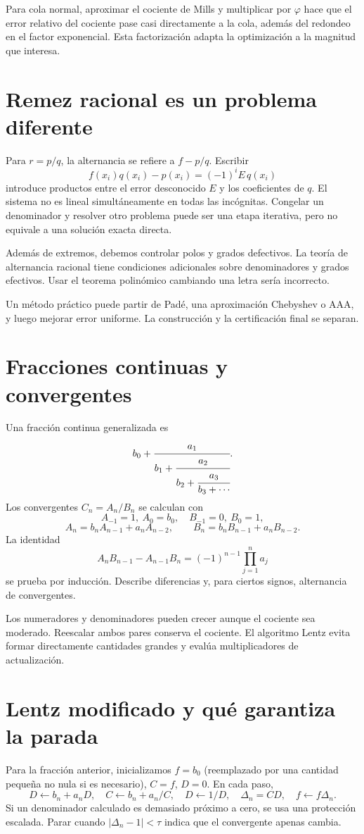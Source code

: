 \documentclass[11pt,a4paper]{article}
\theoremstyle{definition}
\newcommand{\ph}{\varphi}
\newcounter{problema}
\begin{document}
Para cola normal, aproximar el cociente de Mills y multiplicar por $\ph$ hace que el error relativo del cociente pase casi directamente a la cola, además del redondeo en el factor exponencial. Esta factorización adapta la optimización a la magnitud que interesa.

\section{Remez racional es un problema diferente}
Para $r=p/q$, la alternancia se refiere a $f-p/q$. Escribir
\[
f(x_i)q(x_i)-p(x_i)=(-1)^iE\,q(x_i)
\]
introduce productos entre el error desconocido $E$ y los coeficientes de $q$. El sistema no es lineal simultáneamente en todas las incógnitas. Congelar un denominador y resolver otro problema puede ser una etapa iterativa, pero no equivale a una solución exacta directa.

Además de extremos, debemos controlar polos y grados defectivos. La teoría de alternancia racional tiene condiciones adicionales sobre denominadores y grados efectivos. Usar el teorema polinómico cambiando una letra sería incorrecto.

Un método práctico puede partir de Padé, una aproximación Chebyshev o AAA, y luego mejorar error uniforme. La construcción y la certificación final se separan.

\section{Fracciones continuas y convergentes}
Una fracción continua generalizada es
\[
b_0+\cfrac{a_1}{b_1+\cfrac{a_2}{b_2+\cfrac{a_3}{b_3+\cdots}}}.
\]
Los convergentes $C_n=A_n/B_n$ se calculan con
\[
A_{-1}=1,\ A_0=b_0,\quad B_{-1}=0,\ B_0=1,
\]
\[
A_n=b_nA_{n-1}+a_nA_{n-2},\qquad
B_n=b_nB_{n-1}+a_nB_{n-2}.
\]
La identidad
\[
A_nB_{n-1}-A_{n-1}B_n
=(-1)^{n-1}\prod_{j=1}^na_j
\]
se prueba por inducción. Describe diferencias y, para ciertos signos, alternancia de convergentes.

Los numeradores y denominadores pueden crecer aunque el cociente sea moderado. Reescalar ambos pares conserva el cociente. El algoritmo Lentz evita formar directamente cantidades grandes y evalúa multiplicadores de actualización.

\section{Lentz modificado y qué garantiza la parada}
Para la fracción anterior, inicializamos $f=b_0$ (reemplazado por una cantidad pequeña no nula si es necesario), $C=f$, $D=0$. En cada paso,
\[
D\leftarrow b_n+a_nD,\quad C\leftarrow b_n+a_n/C,
\quad D\leftarrow1/D,\quad \Delta_n=CD,\quad f\leftarrow f\Delta_n.
\]
Si un denominador calculado es demasiado próximo a cero, se usa una protección escalada. Parar cuando $|\Delta_n-1|<\tau$ indica que el convergente apenas cambia.
\end{document}
